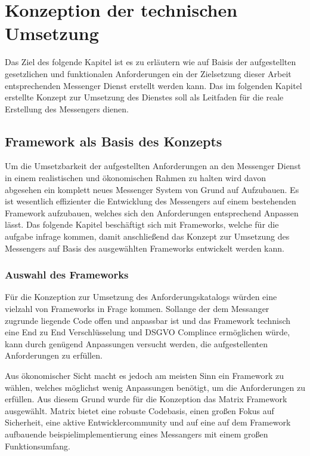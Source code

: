 \chapter{Konzeption der technischen Umsetzung}\label{chapter:tanforderungen}
Das Ziel des folgende Kapitel ist es zu erläutern wie auf Baisis der aufgestellten gesetzlichen und funktionalen Anforderungen ein der Zielsetzung dieser Arbeit entsprechenden Messenger Dienst erstellt werden kann. Das im folgenden Kapitel erstellte Konzept zur Umsetzung des Dienstes soll als Leitfaden für die reale Erstellung des Messengers dienen. 

\section{Framework als Basis des Konzepts}\label{chapter:kr}
Um die Umsetzbarkeit der aufgestellten Anforderungen an den Messenger Dienst in einem realistischen und ökonomischen Rahmen zu halten wird davon abgesehen ein komplett neues Messenger System von Grund auf Aufzubauen. Es ist wesentlich effizienter die Entwicklung des Messengers auf einem bestehenden Framework aufzubauen, welches sich den Anforderungen entsprechend Anpassen lässt. Das folgende Kapitel beschäftigt sich mit Frameworks, welche für die aufgabe infrage kommen, damit anschließend das Konzept zur Umsetzung des Messengers auf Basis des ausgewählten Frameworks entwickelt werden kann. 

\subsection{Auswahl des Frameworks}\label{chapter:am}
Für die Konzeption zur Umsetzung des Anforderungskatalogs würden eine vielzahl von Frameworks in Frage kommen. Sollange der dem Messanger zugrunde liegende Code offen und anpassbar ist und das Framework technisch eine End zu End Verschlüsselung und DSGVO Complince ermöglichen würde, kann durch genügend Anpassungen versucht werden, die aufgestellenten Anforderungen zu erfüllen. 

Aus ökonomischer Sicht macht es jedoch am meisten Sinn ein Framework zu wählen, welches möglichst wenig Anpassungen benötigt, um die Anforderungen zu erfüllen. Aus diesem Grund wurde für die Konzeption das Matrix Framework ausgewählt.
Matrix bietet eine robuste Codebasis, einen großen Fokus auf Sicherheit, eine aktive Entwicklercommunity und auf eine auf dem Framework aufbauende beispielimplementierung eines Messangers mit einem großen Funktionsumfang. 


